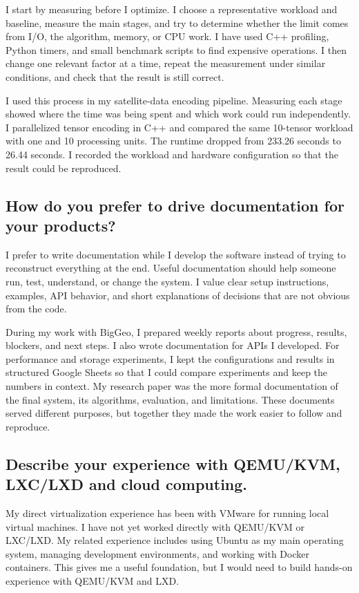 \documentclass[11pt]{article}
\begin{document}
I start by measuring before I optimize. I choose a representative workload and baseline, measure the main stages, and try to determine whether the limit comes from I/O, the algorithm, memory, or CPU work. I have used C++ profiling, Python timers, and small benchmark scripts to find expensive operations. I then change one relevant factor at a time, repeat the measurement under similar conditions, and check that the result is still correct.

I used this process in my satellite-data encoding pipeline. Measuring each stage showed where the time was being spent and which work could run independently. I parallelized tensor encoding in C++ and compared the same 10-tensor workload with one and 10 processing units. The runtime dropped from 233.26 seconds to 26.44 seconds. I recorded the workload and hardware configuration so that the result could be reproduced.

\subsection*{How do you prefer to drive documentation for your products?}

I prefer to write documentation while I develop the software instead of trying to reconstruct everything at the end. Useful documentation should help someone run, test, understand, or change the system. I value clear setup instructions, examples, API behavior, and short explanations of decisions that are not obvious from the code.

During my work with BigGeo, I prepared weekly reports about progress, results, blockers, and next steps. I also wrote documentation for APIs I developed. For performance and storage experiments, I kept the configurations and results in structured Google Sheets so that I could compare experiments and keep the numbers in context. My research paper was the more formal documentation of the final system, its algorithms, evaluation, and limitations. These documents served different purposes, but together they made the work easier to follow and reproduce.

\subsection*{Describe your experience with QEMU/KVM, LXC/LXD and cloud computing.}

My direct virtualization experience has been with VMware for running local virtual machines. I have not yet worked directly with QEMU/KVM or LXC/LXD. My related experience includes using Ubuntu as my main operating system, managing development environments, and working with Docker containers. This gives me a useful foundation, but I would need to build hands-on experience with QEMU/KVM and LXD.
\end{document}

